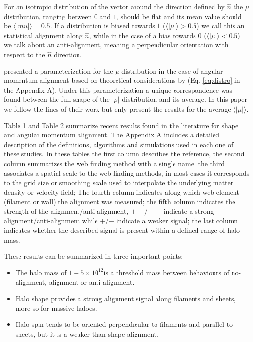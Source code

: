 \documentclass[useAMS,usenatbib]{mn2e}
\newcommand{\hMsun}{{\ifmmode{h^{-1}{\rm
        {M_{\odot}}}}\else{$h^{-1}{\rm{M_{\odot}}}$~}\fi}}
\begin{document}
For an isotropic distribution of the vector around the direction defined by
$\hat{n}$ the $\mu$ distribution, ranging between $0$ and $1$, should
be flat and its mean value should be
$\langle|mu|\rangle=0.5$. If a distribution is biased towards $1$
($\langle\vert\mu\vert\rangle>0.5$) we call this an statistical
alignment along $\hat{n}$, while in the case of a bias towards $0$
($\langle\vert\mu\vert\rangle<0.5$) we talk about an anti-alignment,
meaning a perpendicular orientation with respect to the $\hat{n}$
direction.

\cite{Trowland2013} presented a parameterization for the $\mu$
distribution in the case of angular momentum alignment based on
theoretical considerations by \cite{Lee2005} (Eq. \ref{eq:distro} in
the Appendix A). Under this parameterization a unique
correspondence was found between the full shape of the $\vert\mu\vert$
distribution and its average. In this paper we follow the lines of their work but
only present the results for the average $\langle\vert\mu\vert\rangle$.

Table 1 and Table 2 summarize recent results found in the literature for
shape and angular momentum alignment. The Appendix A includes a detailed
description of the definitions, algorithms and simulations used in
each one of these studies. In these tables the first column describes
the reference, the second column summarizes the web finding method
with a single name, the third associates a spatial scale to the
web finding methods, in most cases it corresponds to the grid size or
smoothing scale used to interpolate the underlying matter density or
velocity field; The fourth column indicates along which web element
(filament or wall) the alignment was measured; the fifth column
indicates the strength of the alignment/anti-alignment, $++$/$--$
indicate a strong alignment/anti-alignment while $+$/$-$ indicate a
weaker signal; the last column indicates whether the described signal
is present within a defined range of halo mass.

These results can be summarized in three important points:
\begin{itemize}
\item The halo mass of $1-5\times 10^{12}$\hMsun is a threshold mass between
behaviours of no-alignment, alignment or anti-alignment.
\item Halo shape provides a strong alignment signal along filaments
  and sheets, more so for massive haloes.
\item Halo spin tends to be oriented perpendicular to filaments and
parallel to sheets, but it is a weaker than shape alignment.
\end{itemize}
\end{document}
